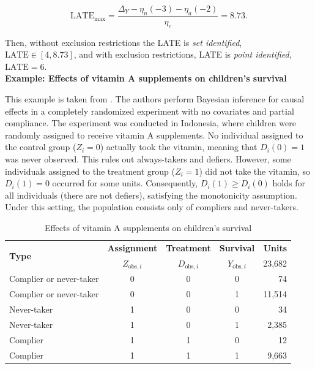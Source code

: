 \[
\text{LATE}_{\max} = \frac{\Delta_Y - \eta_n (-3) - \eta_a (-2)}{\eta_c}
= 8.73.
\]

Then, without exclusion restrictions the LATE is \textit{set identified}, \(\text{LATE} \in [4, 8.73]\), and with exclusion restrictions, LATE is \textit{point identified}, \(\text{LATE} = 6\).\\

\textbf{Example: Effects of vitamin A supplements on children's survival}

This example is taken from \cite{imbens1997bayesian}. The authors perform Bayesian inference for causal effects in a completely randomized experiment with no covariates and partial compliance. The experiment was conducted in Indonesia, where children were randomly assigned to receive vitamin A supplements. No individual assigned to the control group ($Z_i = 0$) actually took the vitamin, meaning that $D_i(0) = 1$ was never observed. This rules out always-takers and defiers. However, some individuals assigned to the treatment group ($Z_i = 1$) did not take the vitamin, so $D_i(1) = 0$ occurred for some units. Consequently, $D_i(1) \geq D_i(0)$ holds for all individuals (there are not defiers), satisfying the monotonicity assumption. Under this setting, the population consists only of compliers and never-takers.

\begin{table}[h!]
	\caption{Effects of vitamin A supplements on children's survival \cite{imbens1997bayesian}}
	\label{tab:observed_data}
	\begin{minipage}{0.5\textwidth}
		\begin{tabular}{lcccr}
			\hline
			\multirow{2}{*}{\textbf{Type}} & \textbf{Assignment} & \textbf{Treatment} & \textbf{Survival}  & \textbf{Units} \\
			& $Z_{\text{obs},i}$ & $D_{\text{obs},i}$ & $Y_{\text{obs},i}$ & 23,682 \\
			\hline
			Complier or never-taker & 0 & 0 & 0 & 74 \\
			Complier or never-taker & 0 & 0 & 1 & 11,514 \\
			Never-taker & 1 & 0 & 0 & 34 \\
			Never-taker & 1 & 0 & 1 & 2,385 \\
			Complier & 1 & 1 & 0 & 12 \\
			Complier & 1 & 1 & 1 & 9,663 \\
			\hline
		\end{tabular}
	\end{minipage}
\end{table}

